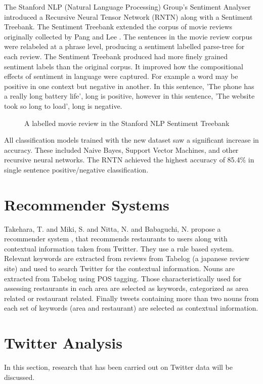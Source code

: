 The Stanford NLP (Natural Language Processing) Group's Sentiment Analyser \cite{stanfordSentiment2013} introduced a Recursive Neural Tensor Network (RNTN) along with a Sentiment Treebank. The Sentiment Treebank extended the corpus of movie reviews originally collected by Pang and Lee \cite{panglee2004}. The sentences in the movie review corpus were relabeled at a phrase level, producing a sentiment labelled parse-tree for each review. The Sentiment Treebank produced had more finely grained sentiment labels than the original corpus. It improved how the compositional effects of sentiment in language were captured. For example a word may be positive in one context but negative in another. In this sentence, 'The phone has a really long battery life', long is positive, however in this sentence, 'The website took so long to load', long is negative.

\begin{figure}
    \centering
    \setlength{\fboxsep}{0pt}
    \setlength{\fboxrule}{0.01pt}
    \setlength{\belowcaptionskip}{-20pt}
    \caption{A labelled movie review in the Stanford NLP Sentiment Treebank \cite{stanfordSentiment2013}}
\end{figure}

All classification models trained with the new dataset saw a significant increase in accuracy. These included Naive Bayes, Support Vector Machines, and other recursive neural networks. The RNTN achieved the highest accuracy of 85.4\% in single sentence positive/negative classification.

\section{Recommender Systems}

Takehara, T. and Miki, S. and Nitta, N. and Babaguchi, N. propose a recommender system \cite{takeharaContext2012}, that recommends restaurants to users along with contextual information taken from Twitter. They use a rule based system. Relevant keywords are extracted from reviews from Tabelog (a japanese review site) and used to search Twitter for the contextual information. Nouns are extracted from Tabelog using POS tagging. Those characteristically used for assessing restaurants in each area are selected as keywords, categorized as area related or restaurant related. Finally tweets containing more than two nouns from each set of keywords (area and restaurant) are selected as contextual information.

\section{Twitter Analysis}

In this section, research that has been carried out on Twitter data will be discussed.